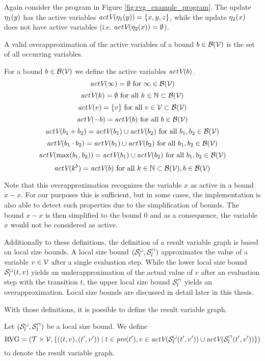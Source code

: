 Again consider the program in Figure \ref{fig:rvg_example_program}.
The update $\eta_1(y)$ has the active variables $\emph{actV}(\eta_1(y)) = \lbrace x,y,z \rbrace$, while the update $\eta_2(x)$ does not have active variables (i.e. $\emph{actV}(\eta_2(x)) = \emptyset$).

A valid overapproximation of the active variables of a bound $b \in \mathcal{B}(\mathcal{V})$ is the set of all occurring variables.
\begin{definition}
  For a bound $b \in \mathcal{B}(\mathcal{V})$ we define the active variables $\emph{actV}(b)$.
  \[ \emph{actV}(\infty) = \emptyset \text{ for } \infty \in \mathcal{B}(\mathcal{V}) \]
  \[ \emph{actV}(k) = \emptyset \text{ for all } k \in \mathbb{N} \subset \mathcal{B}(\mathcal{V}) \] 
  \[ \emph{actV}(v) = \lbrace v \rbrace \text{ for all } v \in \mathcal{V} \subset \mathcal{B}(\mathcal{V}) \] 
  \[ \emph{actV}(-b) = \emph{actV}(b) \text{ for all } b \in \mathcal{B}(\mathcal{V}) \] 
  \[ \emph{actV}(b_1 + b_2) = \emph{actV}(b_1) \cup \emph{actV}(b_2) \text{ for all } b_1, b_2 \in \mathcal{B}(\mathcal{V}) \] 
  \[ \emph{actV}(b_1 \cdot b_2) = \emph{actV}(b_1) \cup \emph{actV}(b_2) \text{ for all } b_1, b_2 \in \mathcal{B}(\mathcal{V}) \] 
  \[ \emph{actV}(\max(b_1, b_2)) = \emph{actV}(b_1) \cup \emph{actV}(b_2) \text{ for all } b_1, b_2 \in \mathcal{B}(\mathcal{V}) \]
  \[ \emph{actV}(k^b) = \emph{actV}(b) \text{ for all } k \in \mathbb{N} \subset \mathcal{B}(\mathcal{V}), b \in \mathcal{B}(\mathcal{V}) \]  
\end{definition}

Note that this overapproximation recognizes the variable $x$ as active in a bound $x - x$.
For our purposes this is sufficient, but in some cases, the implementation is also able to detect such properties due to the simplification of bounds.
The bound $x - x$ is then simplified to the bound $0$ and as a consequence, the variable $x$ would not be considered as active.

Additionally to these definitions, the definition of a result variable graph is based on local size bounds.
A local size bound ${({\mathcal{S}^\sqcup_l}, {\mathcal{S}^\sqcap_l})}$ approximates the value of a variable $v \in \mathcal{V}$ after a single evaluation step.
While the lower local size bound ${\mathcal{S}^\sqcup_l}(t,v)$ yields an underapproximation of the actual value of $v$ after an evaluation step with the transition $t$, the upper local size bound ${\mathcal{S}^\sqcap_l}$ yields an overapproximation.
Local size bounds are discussed in detail later in this thesis.

With those definitions, it is possible to define the result variable graph.

\begin{definition}
  Let ${({\mathcal{S}^\sqcup_l}, {\mathcal{S}^\sqcap_l})}$ be a local size bound.
  We define 
  \[ \text{RVG} = (\mathcal{T} \times \mathcal{V}, \lbrace ((t, v), (t', v')) \mid t \in \emph{pre}(t'), v \in \emph{actV}({\mathcal{S}^\sqcup_l}(t',v')) \cup \emph{actV}({\mathcal{S}^\sqcap_l}(t',v')) \rbrace) \]
  to denote the result variable graph.
\end{definition}

